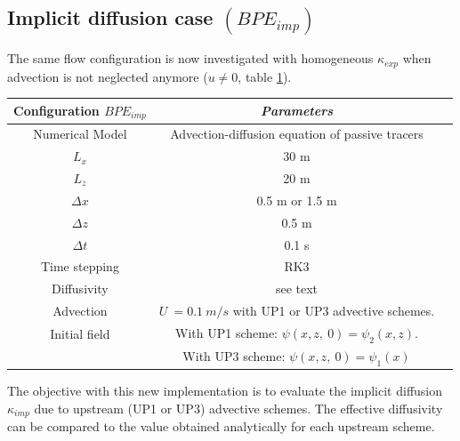 \subsection{Implicit diffusion case $(BPE_{imp})$}
The same flow configuration is now investigated with homogeneous $\kappa_{exp}$ when advection is not neglected anymore ($u \ne 0$, table \ref{tab_NUMLAB_imp}).
\begin{table}[h]
        \centering
        \begin{tabular}{|c|c|c|}
                \hline
                Configuration $BPE_{imp}$ & \textit{Parameters}\\
                \hline 
                Numerical Model & Advection-diffusion equation of passive tracers\\
                $L_x$ & 30 m\\
                $L_z$ & 20 m\\
                $\Delta x$ & 0.5 m or 1.5 m\\
                $\Delta z$ & 0.5 m\\
                $\Delta t$ & 0.1 s\\
                Time stepping & RK3 \\
                Diffusivity & see text \\
                Advection & $U\ = 0.1\ m/s$ with UP1 or UP3 advective schemes.\\
                Initial field & With UP1 scheme: $\psi(x, z,\ 0)=\psi_2(x,z)$. \\
                 & With UP3 scheme: $\psi(x, z,\ 0)=\psi_1(x)$\\
                \hline
        \end{tabular}
        \label{tab_NUMLAB_imp}
\end{table}
The objective with this new implementation is to evaluate the implicit diffusion $\kappa_{imp}$ due to upstream (UP1 or UP3) advective schemes. The effective diffusivity can be compared to the value obtained analytically for each upstream scheme. 

